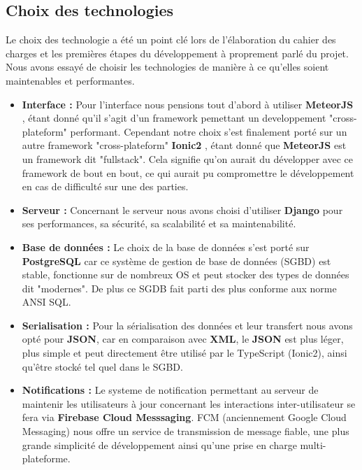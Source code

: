 \documentclass[french]{article}
\begin{document}
		\subsection{Choix des technologies}
		Le choix des technologie a été un point clé lors de l'élaboration du cahier des charges et les premières étapes du développement à proprement parlé du projet.
		Nous avons essayé de choisir les technologies de manière à ce qu'elles soient maintenables et performantes.
		\begin{itemize}
			\item \textbf{Interface :} Pour l'interface nous pensions tout d'abord à utiliser \textbf{MeteorJS} \cite{meteor}, étant donné qu'il s'agit d'un framework pemettant un developpement "cross-plateform" performant. Cependant notre choix s'est finalement porté sur un autre framework "cross-plateform" \textbf{Ionic2} \cite{ionic}, étant donné que \textbf{MeteorJS} est un framework dit "fullstack". Cela signifie qu'on aurait du développer avec ce framework de bout en bout, ce qui aurait pu compromettre le développement en cas de difficulté sur une des parties.
			\item \textbf{Serveur :} Concernant le serveur nous avons choisi d'utiliser \textbf{Django} \cite{django}  pour ses performances, sa sécurité, sa scalabilité et sa maintenabilité.
			\item \textbf{Base de données :} Le choix de la base de données s'est porté sur \textbf{PostgreSQL} car ce système de gestion de base de données (SGBD) est stable, fonctionne sur de nombreux OS et peut stocker des types de données dit "modernes". De plus ce SGDB fait parti des plus conforme aux norme ANSI SQL.
			\item \textbf{Serialisation :} Pour la sérialisation des données et leur transfert nous avons opté pour \textbf{JSON}, car en comparaison avec \textbf{XML}, le \textbf{JSON} est plus léger, plus simple et peut directement être utilisé par le TypeScript (Ionic2), ainsi qu'être stocké tel quel dans le SGBD.
			\item \textbf{Notifications :} Le systeme de notification permettant au serveur de maintenir les utilisateurs à jour concernant les interactions inter-utilisateur se fera via \textbf{Firebase Cloud Messsaging}\cite{firebase}. FCM  (anciennement Google Cloud Messaging) nous offre un service de transmission de message fiable, une plus grande simplicité de développement ainsi qu'une prise en charge multi-plateforme.
		\end{itemize}
		
\end{document}

